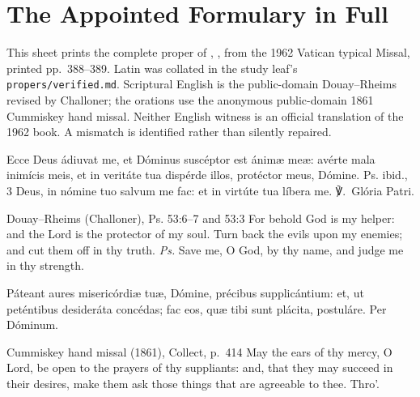 \section*{The Appointed Formulary in Full}

This sheet prints the complete proper of , , from the 1962 Vatican typical Missal,
printed pp.~388--389. Latin was collated in the study leaf's
\nolinkurl{propers/verified.md}. Scriptural English is the public-domain
Douay--Rheims revised by Challoner; the orations use the anonymous
public-domain 1861 Cummiskey hand missal. Neither English witness is an
official translation of the 1962 book. A mismatch is identified rather than
silently repaired.

\begingroup\small
{}
Ecce Deus ádiuvat me, et Dóminus suscéptor est ánimæ meæ: avérte mala
inimícis meis, et in veritáte tua dispérde illos, protéctor meus, Dómine.
\textnormal{Ps. ibid., 3} Deus, in nómine tuo salvum me fac: et in virtúte tua
líbera me. \textnormal{℣.~Glória Patri.}
\finishfulltextelement
\begin{fulltextenglish}{Douay--Rheims (Challoner), Ps. 53:6--7 and 53:3}
For behold God is my helper: and the Lord is the protector of my soul. Turn
back the evils upon my enemies; and cut them off in thy truth. \textit{Ps.}
Save me, O God, by thy name, and judge me in thy strength.
\end{fulltextenglish}

Páteant aures misericórdiæ tuæ, Dómine, précibus supplicántium: et, ut
peténtibus desideráta concédas; fac eos, quæ tibi sunt plácita, postuláre.
Per Dóminum.
\finishfulltextelement
\begin{fulltextenglish}{Cummiskey hand missal (1861), Collect, p.~414}
May the ears of thy mercy, O Lord, be open to the prayers of thy suppliants:
and, that they may succeed in their desires, make them ask those things that
are agreeable to thee. Thro'.
\end{fulltextenglish}


